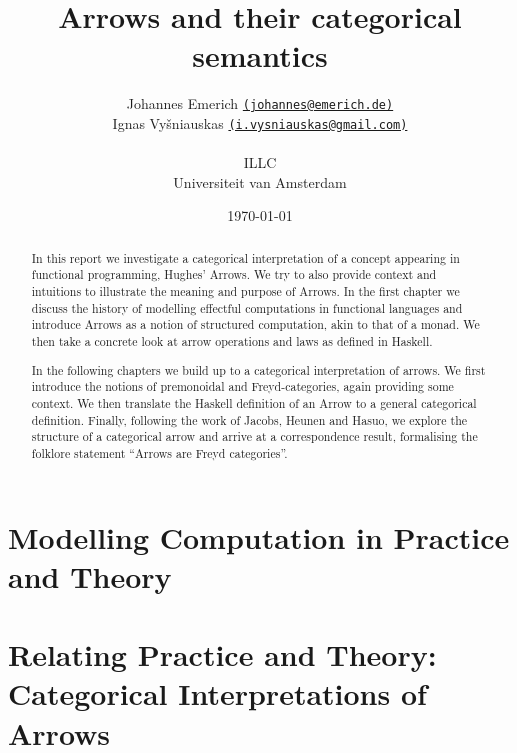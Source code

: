 \documentclass[12pt,a4paper,titlepage]{scrreprt}
\title{Arrows and their categorical semantics}
\author{
    Johannes Emerich
        \href{mailto:johannes@emerich.de}{
        \normalsize \texttt{(johannes@emerich.de)}}\\
    Ignas Vyšniauskas
        \href{mailto:i.vysniauskas@gmail.com}{
        \normalsize \texttt{(i.vysniauskas@gmail.com)}}\\
\\
  ILLC \\
  Universiteit van Amsterdam
}
\date{\today}
\theoremstyle{definition}
\theoremstyle{plain}
\begin{document}
\maketitle

\begin{abstract}
    In this report we investigate a categorical interpretation of a concept
    appearing in functional programming, Hughes' Arrows. We try to also provide
    context and intuitions to illustrate the meaning and purpose of Arrows.  In
    the first chapter we discuss the history of modelling effectful computations
    in functional languages and introduce Arrows as a notion of structured
    computation, akin to that of a monad. We then take a concrete look at arrow
    operations and laws as defined in Haskell.

    In the following chapters we build up to a categorical interpretation of
    arrows. We first introduce the notions of premonoidal and Freyd-categories,
    again providing some context. We then translate the Haskell definition of an
    Arrow to a general categorical definition. Finally, following the work of
    Jacobs, Heunen and Hasuo, we explore the structure of a categorical arrow
    and arrive at a correspondence result, formalising the folklore statement
    ``Arrows are Freyd categories''.
\end{abstract}

\tableofcontents


\chapter{Modelling Computation in Practice and Theory}
    
    
\chapter{Relating Practice and Theory: Categorical Interpretations of Arrows}
    
    
    

\nocite{mustard}
\printbibliography
\end{document}
